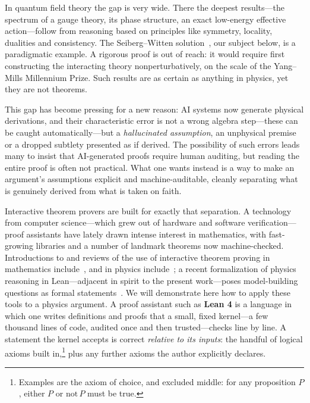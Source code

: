 \documentclass{article}
\theoremstyle{plain}
\theoremstyle{definition}
\numberwithin{equation}{section}
\begin{document}
In quantum field theory the gap is very wide. There the deepest results---the spectrum of a
gauge theory, its phase structure, an exact low-energy effective action---follow from reasoning
based on principles like symmetry, locality, dualities and consistency. The {Seiberg--Witten
solution}~\cite{SeibergWitten1994a,SeibergWitten1994b}, our
subject below, is a paradigmatic example.  A rigorous proof is out of reach: it would require first
constructing the interacting theory nonperturbatively, on the scale of the Yang--Mills
Millennium Prize. Such results are as certain as anything in physics, yet they are not theorems.

This gap has become pressing for a new reason: AI systems now generate physical derivations, and
their characteristic error is not a wrong algebra step---these can be caught automatically---but a
\emph{hallucinated assumption}, an unphysical premise or a dropped subtlety presented as if derived.
The possibility of such errors leads many to insist that AI-generated proofs require human auditing, but 
reading the entire proof is often not practical. 
What one wants instead is a way to make an
argument's assumptions explicit and machine-auditable, cleanly separating what is genuinely derived
from what is taken on faith.

Interactive theorem provers are built for exactly that separation. A technology from computer
science---which grew out of hardware and software verification---proof assistants have lately
drawn intense interest in mathematics, with fast-growing libraries and a number of landmark theorems now machine-checked.
Introductions to and reviews of the use of interactive theorem proving in mathematics
include~\cite{Buzzard2022,Avigad2024,Tao2025}, and in physics
include~\cite{ToobySmith2025,ToobySmith2025Perspective,douglas_formalization_2026};
a recent formalization of physics reasoning in Lean---adjacent in spirit to the present
work---poses model-building questions as formal statements~\cite{KrippendorfToobySmith2026}.
We will demonstrate here how to apply these tools to a physics argument. A proof assistant such as \textbf{Lean 4} is a
language in which one writes definitions and proofs that a small, fixed {kernel}---a few
thousand lines of code, audited once and then trusted---checks line by line. A statement the kernel accepts is correct \emph{relative to its
inputs}: the handful of logical axioms built in,\footnote{Examples are the axiom of choice, and excluded middle:
for any proposition $P$, either $P$ or $\mbox{not}\,P$ must be true.
} 
plus any further {axioms} the author explicitly declares. 
\end{document}
